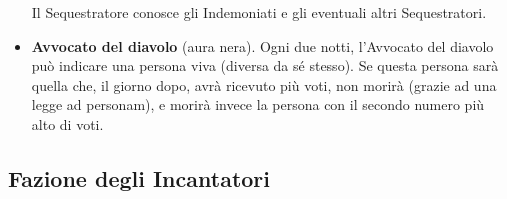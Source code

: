 \documentclass[a4paper,10pt]{article}
\begin{document}
\begin{itemize}
 Il Sequestratore conosce gli Indemoniati e gli eventuali altri Sequestratori.

 \item {\bf Avvocato del diavolo} (aura nera). Ogni due notti, l'Avvocato del diavolo può indicare una persona viva (diversa da sé stesso). Se questa persona sarà quella che, il giorno dopo, avrà ricevuto più voti, non morirà (grazie ad una legge ad personam), e morirà invece la persona con il secondo numero più alto di voti.


\end{itemize}

\subsection*{Fazione degli Incantatori}
\end{document}
